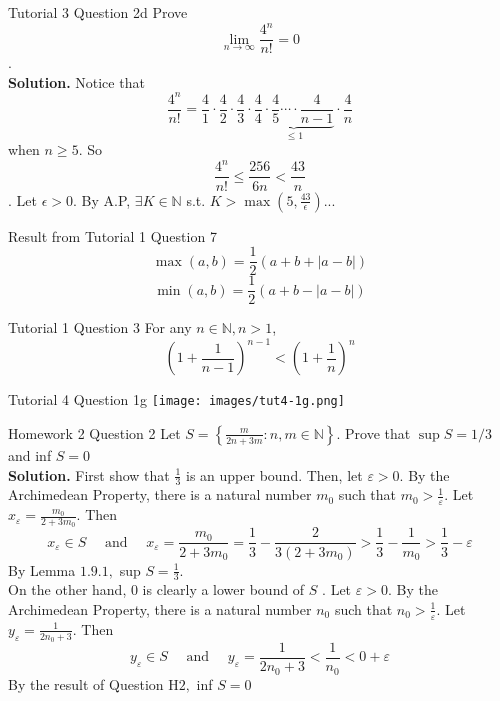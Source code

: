 \documentclass[10pt,landscape]{article}
\theoremstyle{definition}
\newcommand{\thistheoremname}{}
\newtheorem*{genericthm*}{\thistheoremname}
\newenvironment{namedthm*}[1]
{\renewcommand{\thistheoremname}{#1}\begin{genericthm*}}
{\end{genericthm*}}
\begin{document}
\begin{multicols}{3}
\begin{namedthm*}{Tutorial 3 Question 2d}
Prove $$\lim_{n \rightarrow \infty}{\frac{4^n}{n!}} = 0$$.\\
\textbf{Solution.} Notice that 
$$\frac{4^n}{n!} = \frac{4}{1}\cdot\frac{4}{2}\cdot\frac{4}{3}\cdot\underbrace{\frac{4}{4}\cdot\frac{4}{5}\cdots\cdot\frac{4}{n-1}}_\text{$\leq 1$}\cdot\frac{4}{n}$$ when $n \geq 5$. So $$\frac{4^n}{n!} \leq \frac{256}{6n} < \frac{43}{n}$$. Let $\epsilon > 0$. By A.P, $\exists K \in \mathbb{N}$ s.t. $K > \max(5,\frac{43}{\epsilon})$...
\end{namedthm*}
\begin{namedthm*}{Result from Tutorial 1 Question 7}
$$\max(a,b) = \frac{1}{2}\left(a + b + |a-b|\right)$$
$$\min(a,b) = \frac{1}{2}\left(a + b - |a-b|\right)$$
\end{namedthm*}

\begin{namedthm*}{Tutorial 1 Question 3}
For any $n \in \mathbb{N}, n > 1$,$$\left(1+\frac{1}{n-1}\right)^{n-1}<\left(1+\frac{1}{n}\right)^{n}$$
\end{namedthm*}

\begin{namedthm*}{Tutorial 4 Question 1g}
\texttt{[image: images/tut4-1g.png]}
\end{namedthm*}

\begin{namedthm*}{Homework 2 Question 2}
Let $S=\left\{\frac{m}{2 n+3 m} : n, m \in \mathbb{N}\right\} .$ Prove that $\sup S=1 / 3$ and inf $S=0$
\\\textbf{Solution.} First show that $\frac{1}{3}$ is an upper bound. Then, let $\varepsilon>0 .$ By the Archimedean Property, there is a natural number $m_{0}$ such that $m_{0}>\frac{1}{\varepsilon} .$ Let
$x_{\varepsilon}=\frac{m_{0}}{2+3 m_{0}} .$ Then
\[
x_{\varepsilon} \in S \quad \text { and } \quad x_{\varepsilon}=\frac{m_{0}}{2+3 m_{0}}=\frac{1}{3}-\frac{2}{3\left(2+3 m_{0}\right)}>\frac{1}{3}-\frac{1}{m_{0}}>\frac{1}{3}-\varepsilon
\]
By Lemma $1.9 .1,$ sup $S=\frac{1}{3} .$\\
On the other hand, 0 is clearly a lower bound of $S$ . Let $\varepsilon>0 .$ By the Archimedean Property, there
is a natural number $n_{0}$ such that $n_{0}>\frac{1}{\varepsilon} .$ Let $y_{\varepsilon}=\frac{1}{2 n_{0}+3} .$ Then
\[
y_{\varepsilon} \in S \quad \text { and } \quad y_{\varepsilon}=\frac{1}{2 n_{0}+3}<\frac{1}{n_{0}}<0+\varepsilon
\]
By the result of Question $\mathrm{H} 2,$ inf $S=0$
\end{namedthm*}


\end{multicols}
\end{document}
